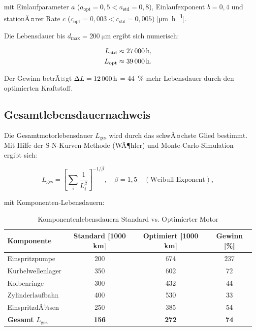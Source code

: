 ﻿\documentclass[12pt,a4paper]{article}
\begin{document}
mit Einlaufparameter $a$ ($a_{\mathrm{opt}} = 0{,}5 < a_{\mathrm{std}} = 0{,}8$),
Einlaufexponent $b = 0{,}4$ und stationÃ¤rer Rate $c$
($c_{\mathrm{opt}} = 0{,}003 < c_{\mathrm{std}} = 0{,}005$)
[\si{\micro\m\per\hour}].

Die Lebensdauer bis $d_{\max} = \SI{200}{\micro\m}$ ergibt sich numerisch:

\begin{align}
  L_{\mathrm{std}} &\approx \SI{27\,000}{\hour}, \\
  L_{\mathrm{opt}} &\approx \SI{39\,000}{\hour}.
\end{align}

Der Gewinn betrÃ¤gt $\Delta L = \SI{12\,000}{\hour}$ = \SI{44}{\percent}
mehr Lebensdauer durch den optimierten Kraftstoff.

\subsection{Gesamtlebensdauernachweis}
\label{sec:tribologie_gesamt}

Die Gesamtmotorlebensdauer $L_{\mathrm{ges}}$ wird durch das schwÃ¤chste Glied
bestimmt. Mit Hilfe der S-N-Kurven-Methode (WÃ¶hler) und Monte-Carlo-Simulation
ergibt sich:

\begin{equation}
  L_{\mathrm{ges}} = \left[\sum_{i} \frac{1}{L_i^{\beta}}\right]^{-1/\beta},
  \quad \beta = 1{,}5 \quad (\text{Weibull-Exponent}),
\end{equation}

mit Komponenten-Lebensdauern:

\begin{table}[H]
  \centering
  \caption{Komponentenlebensdauern Standard vs. Optimierter Motor}
  \label{tab:lebensdauern}
  \begin{tabular}{lSSS}
    \toprule
    Komponente & {Standard [1000 km]} & {Optimiert [1000 km]} & {Gewinn [\%]} \\
    \midrule
    Einspritzpumpe & 200 & 674 & 237 \\
    Kurbelwellenlager & 350 & 602 & 72 \\
    Kolbenringe & 300 & 432 & 44 \\
    Zylinderlaufbahn & 400 & 530 & 33 \\
    EinspritzdÃ¼sen & 250 & 385 & 54 \\
    \midrule
    \textbf{Gesamt $L_{\mathrm{ges}}$} & \textbf{156} & \textbf{272} & \textbf{74} \\
    \bottomrule
  \end{tabular}
\end{table}
\end{document}
